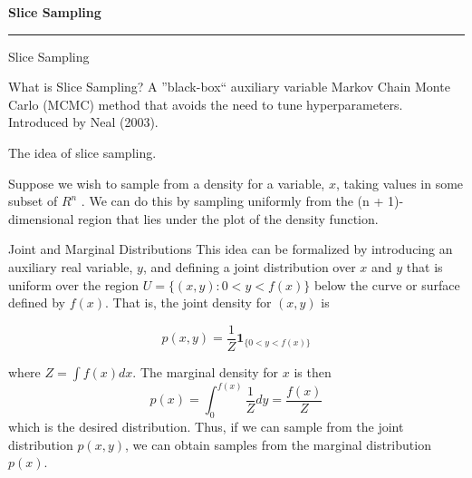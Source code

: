 \begin{frame}
	\vspace{2cm}
	\begin{center}
		{\Huge\textbf{\textcolor{copenhagenred}{Slice Sampling}}}
		\vspace{2cm}
		\vspace{1cm}

		\rule{4cm}{3pt}
	\end{center}
\end{frame}

\begin{frame}{Slice Sampling}
	\begin{block}{What is Slice Sampling?}
		A ''black-box`` auxiliary variable Markov Chain Monte Carlo (MCMC) method that
		avoids the need to tune hyperparameters. Introduced by Neal (2003).
	\end{block}

	The idea of slice sampling. 
	
	Suppose we wish to sample from a density  for a
	variable, $x$, taking values in some subset of $R^n$ . We can do this by sampling uniformly from the
	(n + 1)-dimensional region that lies under the plot of the density function.
\end{frame}

\begin{frame}{Joint and Marginal Distributions}
	This idea can be
	formalized by introducing an auxiliary real variable, $y$, and deﬁning a joint
	distribution over $x$ and $y$ that is uniform over the region
	$U = \{ (x,y):0 < y < f (x) \}$ below the curve or surface deﬁned
	by $f (x)$. That is, the joint density for $(x,y)$ is

	\begin{equation*}
		p(x,y) = \frac{1}{Z} \mathbf{1}_{\{0 < y < f(x)\} } 
	\end{equation*}

	where $Z = \int f(x)dx$. The marginal density for $x$ is then
	\begin{equation*}
		p(x) = \int_0^{f(x)} \frac{1}{Z} dy = \frac{f(x)}{Z}
	\end{equation*}
	which is the desired distribution. Thus, if we can sample from the joint
	distribution $p(x,y)$, we can obtain samples from the marginal distribution $p(x)$.
\end{frame}

